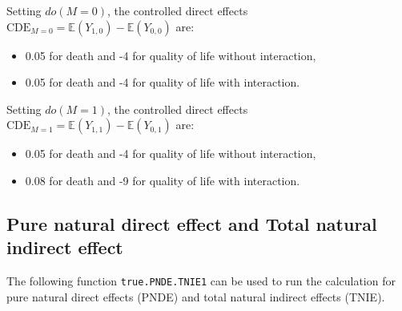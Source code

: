 \documentclass[
]{book}
\providecommand{\tightlist}{%
  \setlength{\itemsep}{0pt}\setlength{\parskip}{0pt}}
\begin{document}
Setting \(do(M=0)\), the controlled direct effects \(\text{CDE}_{M=0} = \mathbb{E}\left(Y_{1,0} \right) - \mathbb{E}\left(Y_{0,0} \right)\) are:

\begin{itemize}
\tightlist
\item
  0.05 for death and -4 for quality of life without interaction,
\item
  0.05 for death and -4 for quality of life with interaction.
\end{itemize}

Setting \(do(M=1)\), the controlled direct effects \(\text{CDE}_{M=1} = \mathbb{E}\left(Y_{1,1} \right) - \mathbb{E}\left(Y_{0,1} \right)\) are:

\begin{itemize}
\tightlist
\item
  0.05 for death and -4 for quality of life without interaction,
\item
  0.08 for death and -9 for quality of life with interaction.
\end{itemize}

\subsection{Pure natural direct effect and Total natural indirect effect}\label{pure-natural-direct-effect-and-total-natural-indirect-effect}

The following function \texttt{true.PNDE.TNIE1} can be used to run the calculation for pure natural direct effects (PNDE) and total natural indirect effects (TNIE).
\end{document}
